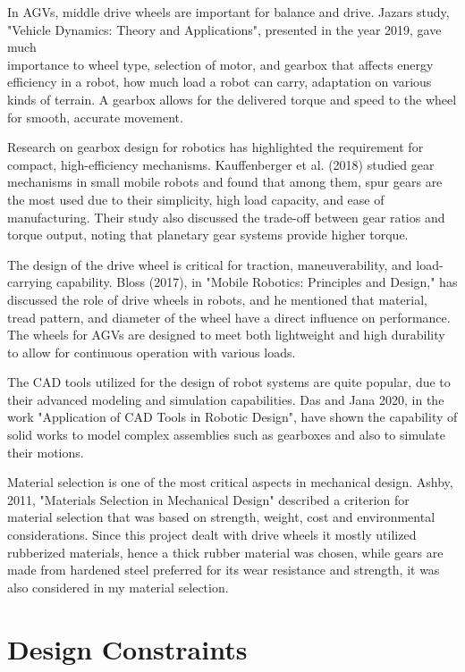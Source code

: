 \documentclass[../../main]{subfiles}
\begin{document}
In AGVs, middle drive wheels are important for balance and drive.
Jazar\textquotesingle s study\cite{jazar2019road}, "Vehicle Dynamics: Theory and
Applications", presented in the year 2019, gave much \\importance to wheel
type, selection of motor, and gearbox that affects energy efficiency in
a robot, how much load a robot can carry, adaptation on various kinds of
terrain. A gearbox allows for the delivered torque and speed to the
wheel for smooth, accurate movement.

Research on gearbox design for robotics has highlighted the requirement
for compact, high-efficiency mechanisms. Kauffenberger et al. (2018)
studied gear mechanisms in small mobile robots and found that among
them, spur gears are the most used due to their simplicity, high load
capacity, and ease of manufacturing. Their study also discussed the
trade-off between gear ratios and torque output, noting that planetary
gear systems provide higher torque.

The design of the drive wheel is critical for traction, maneuverability,
and load-carrying capability. Bloss (2017), in "Mobile Robotics:
Principles and Design," has discussed the role of drive wheels in
robots, and he mentioned that material, tread pattern, and diameter of
the wheel have a direct influence on performance. The wheels for AGVs
are designed to meet both lightweight and high durability to allow for
continuous operation with various loads.

The CAD tools utilized for the design of robot systems are quite
popular, due to their advanced modeling and simulation capabilities. Das
and Jana 2020, in the work "Application of CAD Tools in Robotic Design",
have shown the capability of solid works to model complex assemblies
such as gearboxes and also to simulate their motions.

Material selection is one of the most critical aspects in mechanical
design. Ashby\cite{ashby1994materials}, 2011, "Materials Selection in Mechanical Design"
described a criterion for material selection that was based on strength,
weight, cost and environmental considerations. Since this project dealt
with drive wheels it mostly utilized rubberized materials, hence a thick
rubber material was chosen, while gears are made from hardened steel
preferred for its wear resistance and strength, it was also considered
in my material selection.

\section{Design Constraints}
\end{document}
